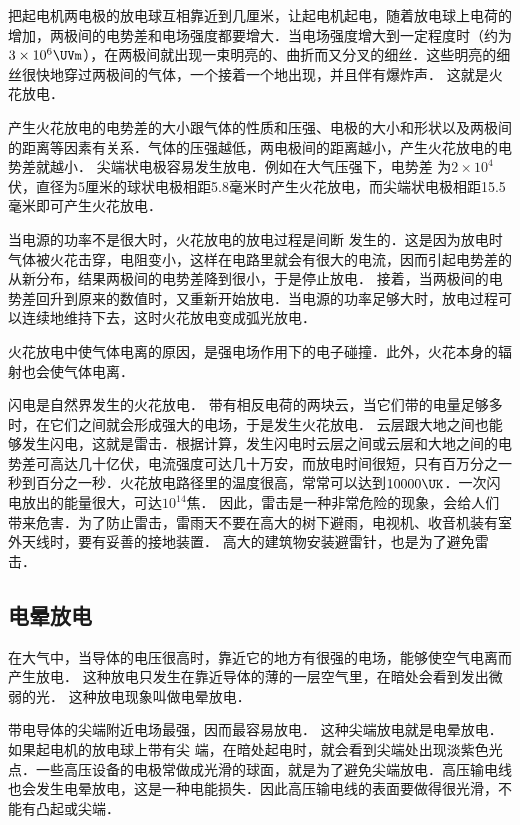 把起电机两电极的放电球互相靠近到几厘米，让起电机起电，随着放电球上电荷的增加，两极间的电势差和电场强度都要增大．当电场强度增大到一定程度时（约为$3\times10^6 \UVm$），在两极间就出现一束明亮的、曲折而又分叉的细丝．这些明亮的细丝很快地穿过两极间的气体，一个接着一个地出现，并且伴有爆炸声．
这就是火花放电．

产生火花放电的电势差的大小跟气体的性质和压强、电极的大小和形状以及两极间的距离等因素有关系．气体的压强越低，两电极间的距离越小，产生火花放电的电势差就越小．
尖端状电极容易发生放电．例如在大气压强下，电势差
为$2\times10^4$伏，直径为5厘米的球状电极相距5.8毫米时产生火花放电，而尖端状电极相距15.5毫米即可产生火花放电．

当电源的功率不是很大时，火花放电的放电过程是间断
发生的．这是因为放电时气体被火花击穿，电阻变小，这样在电路里就会有很大的电流，因而引起电势差的从新分布，结果两极间的电势差降到很小，于是停止放电．
接着，当两极间的电势差回升到原来的数值时，又重新开始放电．当电源的功率足够大时，放电过程可以连续地维持下去，这时火花放电变成弧光放电．

火花放电中使气体电离的原因，是强电场作用下的电子碰撞．此外，火花本身的辐射也会使气体电离．

闪电是自然界发生的火花放电．
带有相反电荷的两块云，当它们带的电量足够多时，在它们之间就会形成强大的电场，于是发生火花放电．
云层跟大地之间也能够发生闪电，这就是雷击．根据计算，发生闪电时云层之间或云层和大地之间的电势差可高达几十亿伏，电流强度可达几十万安，而放电时间很短，只有百万分之一秒到百分之一秒．火花放电路径里的温度很高，常常可以达到$ 10000 \UK $．一次闪电放出的能量很大，可达$10^{14}$焦．
因此，雷击是一种非常危险的现象，会给人们带来危害．为了防止雷击，雷雨天不要在高大的树下避雨，电视机、收音机装有室外天线时，要有妥善的接地装置．
高大的建筑物安装避雷针，也是为了避免雷击．

\subsection{电晕放电}


在大气中，当导体的电压很高时，靠近它的地方有很强的电场，能够使空气电离而产生放电．
这种放电只发生在靠近导体的薄的一层空气里，在暗处会看到发出微弱的光．
这种放电现象叫做电晕放电．

带电导体的尖端附近电场最强，因而最容易放电．
这种尖端放电就是电晕放电．如果起电机的放电球上带有尖
端，在暗处起电时，就会看到尖端处出现淡紫色光点．一些高压设备的电极常做成光滑的球面，就是为了避免尖端放电．高压输电线也会发生电晕放电，这是一种电能损失．因此高压输电线的表面要做得很光滑，不能有凸起或尖端．

